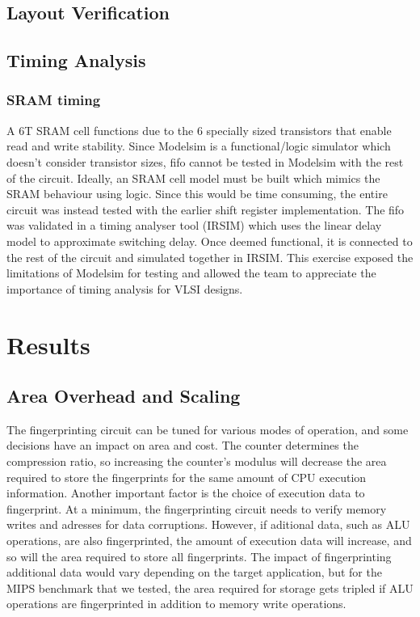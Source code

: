 \documentclass[10pt,journal,compsoc]{IEEEtran}
\begin{document}
\subsection{Layout Verification}
\subsection{Timing Analysis}

\subsubsection {\qquad  SRAM timing}
A 6T SRAM cell functions due to the 6 specially sized transistors that enable read and write stability. Since Modelsim is a functional/logic simulator which doesn’t consider transistor sizes, fifo cannot be tested in Modelsim with the rest of the circuit. Ideally, an SRAM cell model must be built which mimics the SRAM behaviour using logic. Since this would be time consuming, the entire circuit was instead tested with the earlier shift register implementation. The fifo was validated in a timing analyser tool (IRSIM) which uses the linear delay model to approximate switching delay. Once deemed functional, it is connected to the rest of the circuit and simulated together in IRSIM. This exercise exposed the limitations of Modelsim for testing and allowed the team to appreciate the importance of timing analysis for VLSI designs.

\section{Results}
\subsection{Area Overhead and Scaling}

The fingerprinting circuit can be tuned for various modes of operation, and some decisions have an impact on area and cost. The counter determines the compression ratio, so increasing the counter's modulus will decrease the area required to store the fingerprints for the same amount of CPU execution information. Another important factor is the choice of execution data to fingerprint. At a minimum, the fingerprinting circuit needs to verify memory writes and adresses for data corruptions. However, if aditional data, such as ALU operations, are also fingerprinted, the amount of execution data will increase, and so will the area required to store all fingerprints. The impact of fingerprinting additional data would vary depending on the target application, but for the MIPS benchmark that we tested, the area required for storage gets tripled if ALU operations are fingerprinted in addition to memory write operations. 
\end{document}
